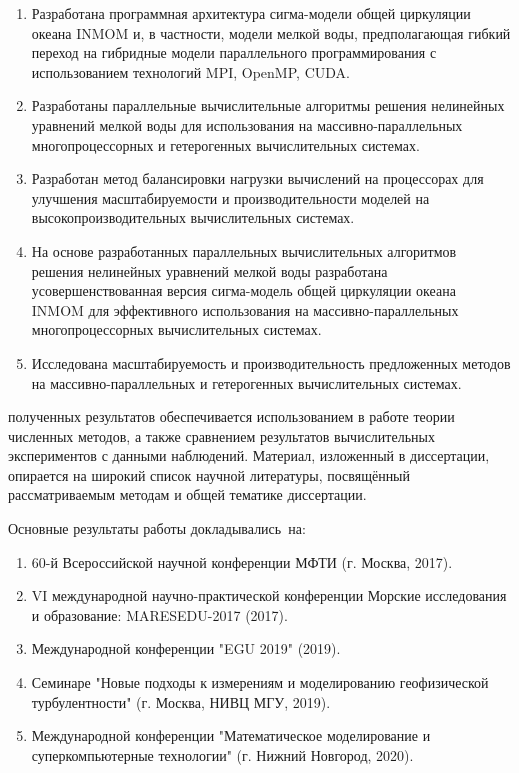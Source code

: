 {}
\begin{enumerate}[beginpenalty=10000] %
    \item Разработана программная архитектура сигма-модели общей циркуляции океана INMOM и, в частности, модели мелкой воды, предполагающая гибкий переход на гибридные модели параллельного программирования с использованием технологий MPI, OpenMP, CUDA.    
    \item Разработаны параллельные вычислительные алгоритмы решения нелинейных уравнений мелкой воды для использования на массивно-параллельных многопроцессорных и гетерогенных вычислительных системах.
    \item Разработан метод балансировки нагрузки вычислений на процессорах для улучшения масштабируемости и производительности моделей на высокопроизводительных вычислительных системах.
    \item На основе разработанных параллельных вычислительных алгоритмов решения нелинейных уравнений мелкой воды разработана усовершенствованная версия сигма-модель общей циркуляции океана INMOM для эффективного использования на массивно-параллельных многопроцессорных вычислительных системах.
    \item Исследована масштабируемость и производительность предложенных методов на массивно-параллельных и гетерогенных вычислительных системах.     
\end{enumerate}

{\reliability} полученных результатов обеспечивается использованием в работе теории численных методов, а также сравнением результатов вычислительных экспериментов с данными наблюдений. Материал, изложенный в диссертации, опирается на широкий список научной литературы, посвящённый рассматриваемым методам и общей тематике диссертации.

{\probation}
Основные результаты работы докладывались~на:
\begin{enumerate}[beginpenalty=10000]
\item 60-й Всероссийской научной конференции МФТИ (г. Москва, 2017).
\item VI международной научно-практической конференции Морские исследования и образование: MARESEDU-2017 (2017).
\item Международной конференции "EGU 2019" (2019).
\item Семинаре "Новые подходы к измерениям и моделированию геофизической турбулентности" (г. Москва, НИВЦ МГУ, 2019).
\item Международной конференции "Математическое моделирование и суперкомпьютерные технологии" (г. Нижний Новгород, 2020).
\end{enumerate}

